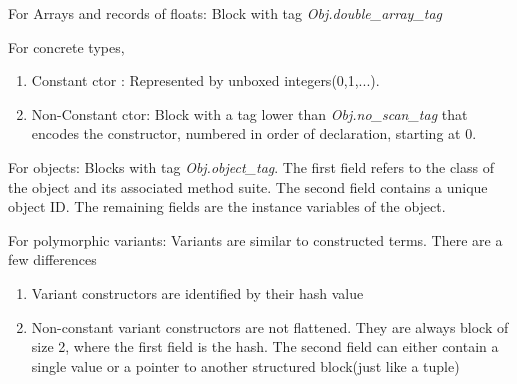 \begin{enumerate}
For Arrays and records of floats: Block with tag
\textit{Obj.double\_array\_tag}

For concrete types, 
\begin{enumerate}
\item Constant ctor : Represented by unboxed integers(0,1,...).
\item Non-Constant ctor: Block with a tag lower than
  \textit{Obj.no\_scan\_tag} that encodes the constructor, numbered in
  order of declaration, starting at 0.
\end{enumerate}

For objects: Blocks with tag \textit{Obj.object\_tag}. The first field
refers to the class of the object and its associated method suite. The
second field contains a unique object ID. The remaining fields are the
instance variables of the object.

For polymorphic variants: Variants are similar to constructed
terms. There are a few differences
\begin{enumerate}
\item Variant constructors are identified by their hash value
\item Non-constant variant constructors are not flattened. They are
  always block of size 2, where the first field is the hash. The
  second field can either contain a single value or a pointer to
  another structured block(just like a tuple)
\end{enumerate}

\end{enumerate}



